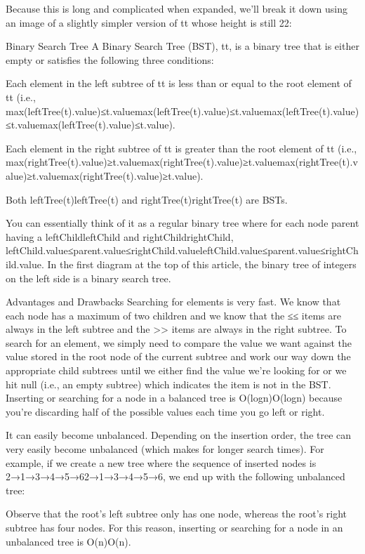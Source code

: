 Because this is long and complicated when expanded, we'll break it down using an image of a slightly simpler version of tt whose height is still 22:



Binary Search Tree
A Binary Search Tree (BST), tt, is a binary tree that is either empty or satisfies the following three conditions:

Each element in the left subtree of tt is less than or equal to the root element of tt (i.e., max(leftTree(t).value)≤t.valuemax(leftTree(t).value)≤t.valuemax(leftTree(t).value)≤t.valuemax(leftTree(t).value)≤t.value).

Each element in the right subtree of tt is greater than the root element of tt (i.e., max(rightTree(t).value)≥t.valuemax(rightTree(t).value)≥t.valuemax(rightTree(t).value)≥t.valuemax(rightTree(t).value)≥t.value).

Both leftTree(t)leftTree(t) and rightTree(t)rightTree(t) are BSTs.

You can essentially think of it as a regular binary tree where for each node parent having a leftChildleftChild and rightChildrightChild, leftChild.value≤parent.value≤rightChild.valueleftChild.value≤parent.value≤rightChild.value. In the first diagram at the top of this article, the binary tree of integers on the left side is a binary search tree.

Advantages and Drawbacks
Searching for elements is very fast.
We know that each node has a maximum of two children and we know that the ≤≤ items are always in the left subtree and the >> items are always in the right subtree. To search for an element, we simply need to compare the value we want against the value stored in the root node of the current subtree and work our way down the appropriate child subtrees until we either find the value we're looking for or we hit null (i.e., an empty subtree) which indicates the item is not in the BST. Inserting or searching for a node in a balanced tree is O(logn)O(log⁡n) because you're discarding half of the possible values each time you go left or right.

It can easily become unbalanced.
Depending on the insertion order, the tree can very easily become unbalanced (which makes for longer search times). For example, if we create a new tree where the sequence of inserted nodes is 2→1→3→4→5→62→1→3→4→5→6, we end up with the following unbalanced tree:



Observe that the root's left subtree only has one node, whereas the root's right subtree has four nodes. For this reason, inserting or searching for a node in an unbalanced tree is O(n)O(n).

